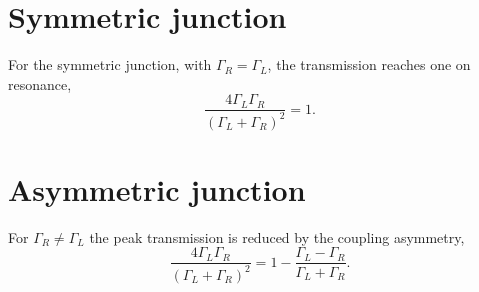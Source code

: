 \documentclass{article}
\begin{document}
\section{Symmetric junction}
For the symmetric junction, with $\Gamma_R = \Gamma_L$, the transmission reaches one on resonance,
\begin{equation}
\frac{4\Gamma_L\Gamma_R}{(\Gamma_L+\Gamma_R)^2} = 1 .
\label{eq:sym}
\end{equation}
\section{Asymmetric junction}
For $\Gamma_R \neq \Gamma_L$ the peak transmission is reduced by the coupling asymmetry,
\begin{equation}
\frac{4\Gamma_L\Gamma_R}{(\Gamma_L+\Gamma_R)^2} = 1 - \frac{\Gamma_L-\Gamma_R}{\Gamma_L+\Gamma_R} .
\label{eq:asym}
\end{equation}
\end{document}

